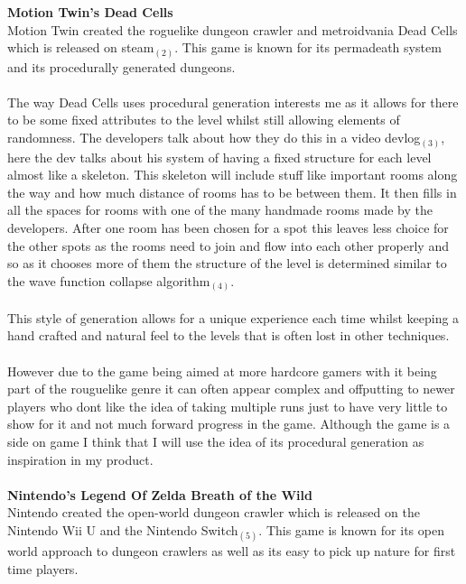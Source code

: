 \documentclass{article}
\begin{document}
        \newpage
        \[\]
        \textbf{Motion Twin's Dead Cells}\\
        Motion Twin created the roguelike dungeon crawler and metroidvania Dead Cells which is released on steam$_{(2)}$. This game is known for its permadeath system and its procedurally generated dungeons.\\
        \\
        The way Dead Cells uses procedural generation interests me as it allows for there to be some fixed attributes to the level whilst still allowing elements of randomness. The developers talk about how they do this in a video devlog$_{(3)}$, here the dev talks about his system of having a fixed structure for each level almost like a skeleton. This skeleton will include stuff like important rooms along the way and how much distance of rooms has to be between them. It then fills in all the spaces for rooms with one of the many handmade rooms made by the developers. After one room has been chosen for a spot this leaves less choice for the other spots as the rooms need to join and flow into each other properly and so as it chooses more of them the structure of the level is determined similar to the wave function collapse algorithm$_{(4)}$.\\
        \\
        This style of generation allows for a unique experience each time whilst keeping a hand crafted and natural feel to the levels that is often lost in other techniques.\\
        \\
        However due to the game being aimed at more hardcore gamers with it being part of the rouguelike genre it can often appear complex and offputting to newer players who dont like the idea of taking multiple runs just to have very little to show for it and not much forward progress in the game. Although the game is a side on game I think that I will use the idea of its procedural generation as inspiration in my product.\\
        \\
        \newpage
        \[\]
        \textbf{Nintendo's Legend Of Zelda Breath of the Wild}\\
        Nintendo created the open-world dungeon crawler which is released on the Nintendo Wii U and the Nintendo Switch$_{(5)}$. This game is known for its open world approach to dungeon crawlers as well as its easy to pick up nature for first time players.\\
        \\
\end{document}

